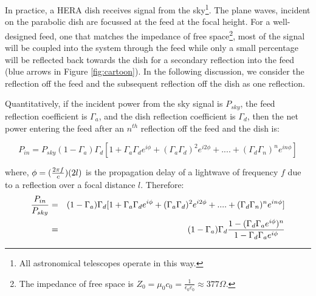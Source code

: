 \documentclass[12pt,preprint]{aastex}
\begin{document}
In practice, a HERA dish receives signal from the sky\footnote{All astronomical
telescopes operate in this way.}. The plane waves, incident on the parabolic dish are focussed at the feed at the focal
height. For a well-designed feed, one that matches the impedance of
free space\footnote{The impedance of free space is $Z_{0} = \mu_{0}c_{0} =
\frac{1}{\epsilon_{0}c_{0}} \approx 377\Omega $.}, most of the signal will be
coupled into the system through the feed while only a small percentage will be reflected
back towards the dish for a secondary reflection into the feed (blue arrows in
Figure \ref{fig:cartoon}).  
 In the following discussion, we consider the reflection
off the feed and the subsequent reflection off the dish as one reflection.



Quantitatively, if the incident power from the sky signal is $P_{sky}$, the feed
reflection coefficient is $\Gamma_{a}$, and the dish reflection
coefficient is $\Gamma_{d}$, then the net power entering the feed after an
$n^{th}$ reflection off the feed and the dish is:

\begin{equation}
P_{in} =  P_{sky}(1-\Gamma_{a})\Gamma_{d} [1+ \Gamma_{a}\Gamma_{d} e^{i\phi}+ (\Gamma_{a}\Gamma_{d})^2e^{i2\phi}+ ....+ (\Gamma_{d}\Gamma_{n})^{n}e^{in\phi}]
\end{equation}

where, $\phi = ({2\pi f \over c})(2l)$ is the propagation delay of a lightwave of frequency $f$ due to a reflection over a focal distance $l$. 
Therefore:
\begin{eqnarray}
{P_{in} \over P_{sky} } & = & (1-\Gamma_{a})\Gamma_{d} [1+ \Gamma_{a}\Gamma_{d} e^{i\phi}+ (\Gamma_{a}\Gamma_{d})^2e^{i2\phi}+ ....+ (\Gamma_{d}\Gamma_{n})^{n}e^{in\phi}] \nonumber\\
      & = & (1-\Gamma_{a})\Gamma_{d} {1-(\Gamma_{d}\Gamma_{a}e^{i\phi})^{n} \over 1-\Gamma_{d} \Gamma_{a} e^{i\phi} } 
\end{eqnarray}
\end{document}
